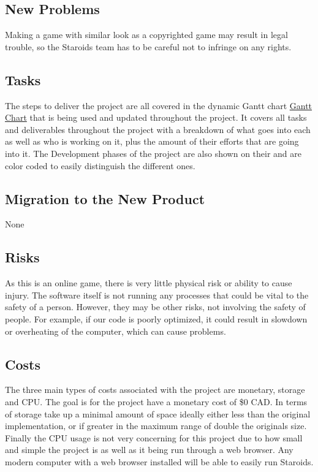 \documentclass[12pt, titlepage]{article}
\begin{document}
\subsection{New Problems}
Making a game with similar look as a copyrighted game may result in legal trouble, so the Staroids team has to be careful not to infringe on any rights.\\

\subsection{Tasks}
The steps to deliver the project are all covered in the dynamic Gantt chart \href{https://gitlab.cas.mcmaster.ca/nagyj2/Staroids/tree/master/ProjectSchedule/StaroidsGantt.pdf}{Gantt Chart} that is being used and updated throughout the project. It covers all tasks and deliverables throughout the project with a breakdown of what goes into each as well as who is working on it, plus the amount of their efforts that are going into it. The Development phases of the project are also shown on their and are color coded to easily distinguish the different ones.\\

\subsection{Migration to the New Product}
None

\subsection{Risks}
As this is an online game, there is very little physical risk or ability to cause injury. The software itself is not running any processes that could be vital to the safety of a person. However, they may be other risks, not involving the safety of people. For example, if our code is poorly optimized, it could result in slowdown or overheating of the computer, which can cause problems.\\

\subsection{Costs}
The three main types of costs associated with the project are monetary, storage and CPU. The goal is for the project have a monetary cost of \$0 CAD. In terms of storage take up a minimal amount of space ideally either less than the original implementation, or if greater in the maximum range of double the originals size. Finally the CPU usage is not very concerning for this project due to how small and simple the project is as well as it being run through a web browser. Any modern computer with a web browser installed will be able to easily run Staroids.\\
\end{document}
